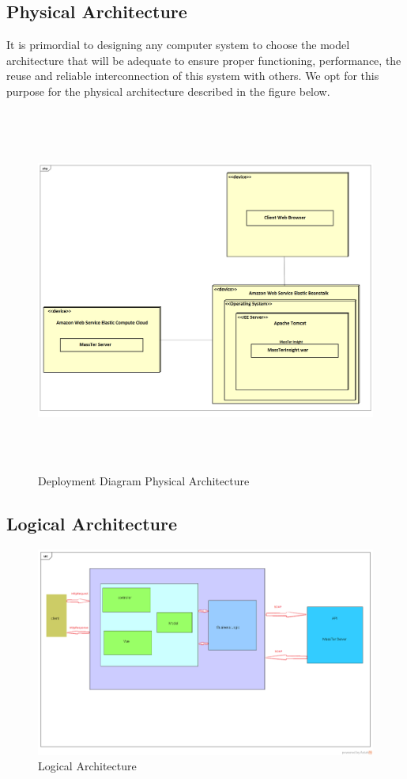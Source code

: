 	\subsection{Physical Architecture}
	It is primordial to designing any computer system to choose the model architecture that will be adequate to ensure proper functioning, performance, the reuse and reliable interconnection of this system with others. We opt for this purpose for the physical architecture described in the figure below.
	\begin{figure}[h]
		\centering
		\includegraphics[width=16.5cm,height=12cm]{DeploymentDiagramPhysicalArchitecture.png}
		\caption{Deployment Diagram Physical Architecture}
	\end{figure}  

	\clearpage
    \newpage  
	
	\subsection{Logical Architecture}
		\begin{figure}[h]
		\centering
		\includegraphics[width=1\textwidth]{logicalArchitecture.png}
		\caption{Logical Architecture}
	\end{figure}  


